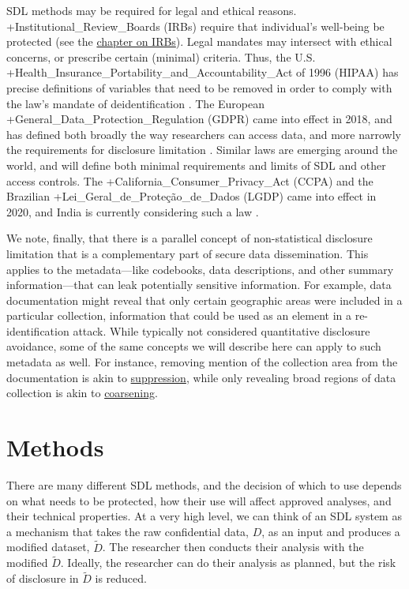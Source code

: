 \documentclass[
]{book}
\begin{document}
SDL methods may be required for legal and ethical reasons. +Institutional\_Review\_Boards\textbar{} (IRBs) require that individual's well-being be protected (see the \protect\hyperlink{irb}{chapter on IRBs}). Legal mandates may intersect with ethical concerns, or prescribe certain (minimal) criteria. Thus, the U.S. +Health\_Insurance\_Portability\_and\_Accountability\_Act\textbar{} of 1996 (HIPAA) \citep{us_department_of_health__human_services_health_nodate} has precise definitions of variables that need to be removed in order to comply with the law's mandate of deidentification \citep{department_of_health_and_human_services_methods_2012}. The European +General\_Data\_Protection\_Regulation\textbar{} (GDPR) came into effect in 2018, and has defined both broadly the way researchers can access data, and more narrowly the requirements for disclosure limitation \citep{cohen_towards_2020, greene_adjusting_2019, molnar-gabor_germany_2018}. Similar laws are emerging around the world, and will define both minimal requirements and limits of SDL and other access controls. The +California\_Consumer\_Privacy\_Act\textbar{} (CCPA) \citep{marini_comparing_2018} and the Brazilian +Lei\_Geral\_de\_Proteção\_de\_Dados\textbar{} (LGDP) \citep{black_6_2020} came into effect in 2020, and India is currently considering such a law \citep{panakal_indias_2019}.

We note, finally, that there is a parallel concept of non-statistical disclosure limitation that is a complementary part of secure data dissemination. This applies to the metadata---like codebooks, data descriptions, and other summary information---that can leak potentially sensitive information. For example, data documentation might reveal that only certain geographic areas were included in a particular collection, information that could be used as an element in a re-identification attack. While typically not considered quantitative disclosure avoidance, some of the same concepts we will describe here can apply to such metadata as well. For instance, removing mention of the collection area from the documentation is akin to \protect\hyperlink{suppression}{suppression}, while only revealing broad regions of data collection is akin to \protect\hyperlink{coarsening}{coarsening}.

\hypertarget{methods}{%
\section{Methods}\label{methods}}

There are many different SDL methods, and the decision of which to use depends on what needs to be protected, how their use will affect approved analyses, and their technical properties. At a very high level, we can think of an SDL system as a mechanism that takes the raw confidential data, \(D\), as an input and produces a modified dataset, \(\tilde{D}\). The researcher then conducts their analysis with the modified \(\tilde{D}\). Ideally, the researcher can do their analysis as planned, but the risk of disclosure in \(\tilde{D}\) is reduced.
\end{document}
